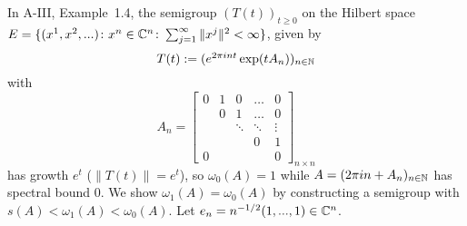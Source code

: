 \begin{example}\label{ex:a4-1.6} 
In A-III, Example~1.4, the semigroup $ (T(t))_{t \geq 0} $ on the Hilbert space $ E = \{(x^1, x^2, ...) \colon x^n \in \mathbb{C}^n\colon\sum_{j=1}^{\infty} \|x^j\|^2 < \infty\} $, given by 
\[\textstyle{
T(t) := (e^{2\pi i n t} \exp(t A_n))_{n \in \mathbb{N}}
}\]
with
\[
A_n =
\begin{bmatrix}
0 & 1 & 0 & \dots & 0 \\
& 0 & 1 & \dots & 0 \\
& & \ddots & \ddots & \vdots \\
& & & 0 & 1 \\
0 & & & & 0
\end{bmatrix}_{n \times n}
\]
has growth $ e^t $ (\ie $ \|T(t)\| = e^t $), so $ \omega_{0}(A) = 1 $ while $ A = (2\pi i n + A_n)_{n \in \mathbb{N}} $ has spectral bound $ 0 $. 
We show $ \omega_1(A) = \omega_{0}(A) $ by constructing a semigroup with $ s(A) < \omega_1(A) < \omega_{0}(A) $. 
Let $ e_n = n^{-1/2} (1, ..., 1) \in \mathbb{C}^n $. 


\end{example}

